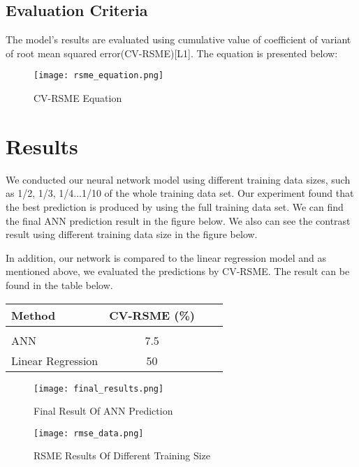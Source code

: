 \documentclass[twoside,11pt]{article}
\begin{document}
\subsection{Evaluation Criteria}

The model's results are evaluated using cumulative value of coefficient of variant of root mean squared error(CV-RSME)[L1]. The equation is presented below:
\begin{figure}[htbp]
  \centering 
  \texttt{[image: rsme\_equation.png]} 
  \caption{CV-RSME Equation}
  \label{fig:example} 
\end{figure}

\section{Results} \label{results}

We conducted our neural network model using different training data sizes, such as 1/2, 1/3, 1/4...1/10 of the whole training data set. Our experiment found that the best prediction is produced by using the full training data set. We can find the final ANN prediction result in the figure below. We also can see the contrast result using different training data size in the figure below.

In addition, our network is compared to the linear regression model and as mentioned above, we evaluated the predictions by CV-RSME. The result can be found in the table below.

\begin{table}[!htbp]
  \centering 
  \begin{tabular}{lclc} 
    Method & CV-RSME (\%) \\ 
    \hline \\[-11pt]
    ANN & 7.5 \\ 
    Linear Regression & 50 \\ \hline 
  \end{tabular}
  \label{tab:example} 
\end{table}

\begin{figure}[!htbp]
  \centering 
  \texttt{[image: final\_results.png]} 
  \caption{Final Result Of ANN Prediction}
  \label{fig:example} 
\end{figure} 

\begin{figure}[!htbp]
  \centering 
  \texttt{[image: rmse\_data.png]} 
  \caption{RSME Results Of Different Training Size}
  \label{fig:example} 
\end{figure} 
\FloatBarrier
\end{document}
